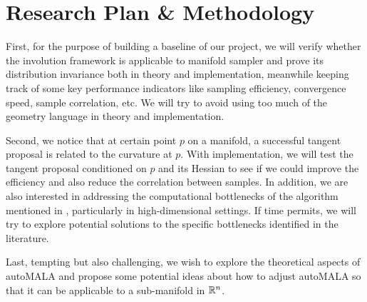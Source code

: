 \documentclass{article}
\begin{document}
\section{Research Plan \& Methodology}

First, for the purpose of building a baseline of our project, we will verify whether the involution framework is applicable to manifold sampler and prove its distribution invariance both in theory and implementation, meanwhile keeping track of some key performance indicators like sampling efficiency, convergence speed, sample correlation, etc. We will try to avoid using too much of the geometry language in theory and implementation.

Second, we notice that at certain point $p$ on a manifold, a successful tangent proposal is related to the curvature at $p$. With implementation, we will test the tangent proposal conditioned on $p$ and its Hessian to see if we could improve the efficiency and also reduce the correlation between samples. In addition, we are also interested in addressing the computational bottlenecks of the algorithm mentioned in \cite{manifoldchild}, particularly in high-dimensional settings. If time permits, we will try to explore potential solutions to the specific bottlenecks identified in the literature.

Last, tempting but also challenging, we wish to explore the theoretical aspects of autoMALA and propose some potential ideas about how to adjust autoMALA so that it can be applicable to a sub-manifold in $\mathbb R^n$.




\nocite{*}



\clearpage

 
\end{document}
